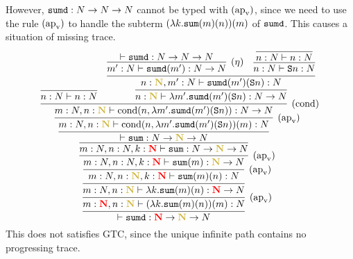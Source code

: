 \documentclass{article}
\newcommand{\bfColor}[2]{{\bf \color{#1}{#2}}}
\newcommand{\Rapv}{\hbox{$(\text{ap}_{\text{v}})$}}
\newcommand{\Reta}{\hbox{$(\eta)$}}
\newcommand{\Rcond}{\hbox{$(\text{cond})$}}
\newcommand{\Sum}{{\tt sum}}
\newcommand{\Sumd}{{\tt sumd}}
\newcommand{\Cond}[2]{\text{cond}(#1,#2)}
\newcommand{\Suc}[1]{{\tt S}#1}
\newcommand{\N}{N}
\newcommand{\gN}{\bfColor{oldgold}{N}}
\newcommand{\rN}{\bfColor{red}{N}}
\begin{document}
However, $\Sumd:\N\to\N\to\N$ cannot be typed with $\Rapv$, 
since we need to use the rule $\Rapv$ to handle
the subterm $(\lambda k.\Sum(m)(n))(m)$ of $\Sumd$. 
This causes a situation of missing trace. 
\[
\infer{
  \vdash \Sumd:\rN\to\gN\to\N
}{
  \infer[\Rapv]{
    m:\rN, n:\gN \vdash (\lambda k.\Sum(m)(n))(m):\N
  }{
    \infer{
      m:\N, n:\gN \vdash \lambda k.\Sum(m)(n):\rN\to\N
    }{
      \infer[\Rapv]{
        m:\N, n:\gN, k:\rN \vdash \Sum(m)(n):\N
      }{
        \infer[\Rapv]{
          m:\N, n:\N, k:\rN \vdash \Sum(m):\gN\to\N
        }{
          \infer{
            m:\N, n:\N, k:\rN \vdash \Sum:\N\to\gN\to\N
          }{
            \infer{
              \vdash \Sum:\N\to\gN\to\N
            }{
              \infer[\Rapv]{
                m:\N,n:\gN\vdash\Cond{n}{\lambda m'.\Sumd(m')(\Suc{n})}(m):\N
              }{
                \infer[\Rcond]{
                  m:\N,n:\gN\vdash\Cond{n}{\lambda m'.\Sumd(m')(\Suc{n})}:\N\to\N
                }{
                  \infer{
                    n:\N \vdash n:\N
                  }{}
                  &
                  \infer{
                    n:\gN\vdash\lambda m'.\Sumd(m')(\Suc{n}):\N\to\N
                  }{
                    \infer{
                      n:\gN,m':\N\vdash\Sumd(m')(\Suc{n}):\N
                    }{
                      \infer[\Reta]{
                        m':\N\vdash\Sumd(m'):\N\to\N
                      }{
                        \vdash\Sumd:\N\to\N\to\N
                      }
                      &
                      \infer{
                        n:\N\vdash\Suc{n}:\N
                      }{
                        \infer{
                          n:\N\vdash n:\N
                        }{}
                      }
                    }
                  }
                }
              }
            }
          }
        }
      }
    }
  }
}
\]
This does not satisfies GTC,
since the unique infinite path contains no progressing trace. 
\end{document}
